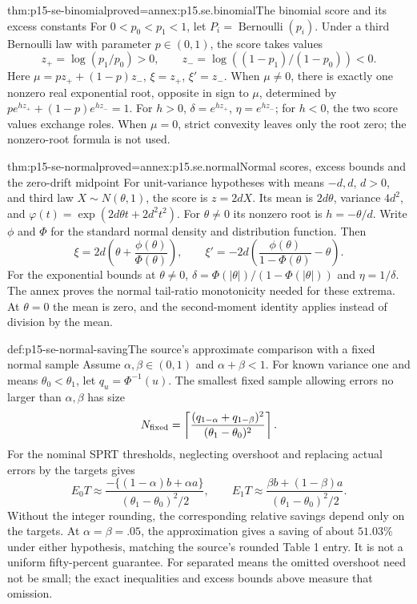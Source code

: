 \begin{hbtheorem}{thm:p15-se-binomial}{proved=annex:p15.se.binomial}{The binomial score and its excess constants}
For \(0<p_0<p_1<1\), let \(P_i=\operatorname{Bernoulli}(p_i)\).
Under a third Bernoulli law with parameter \(p\in(0,1)\), the
score takes values
\[
 z_+=\log(p_1/p_0)>0,\qquad
 z_-=\log((1-p_1)/(1-p_0))<0.
\]
Here \(\mu=pz_++(1-p)z_-\), \(\xi=z_+\), \(\xi'=z_-\).
When \(\mu\ne0\), there is exactly one nonzero real exponential
root, opposite in sign to \(\mu\), determined by
\(pe^{hz_+}+(1-p)e^{hz_-}=1\). For \(h>0\),
\(\delta=e^{hz_+}\), \(\eta=e^{hz_-}\); for \(h<0\),
the two score values exchange roles. When \(\mu=0\), strict
convexity leaves only the root zero; the nonzero-root formula is not used.
\cite[Section 3.5 and Section 4.2]{Wald1945SequentialTests}
\end{hbtheorem}

\begin{hbtheorem}{thm:p15-se-normal}{proved=annex:p15.se.normal}{Normal scores, excess bounds and the zero-drift midpoint}
For unit-variance hypotheses with means \(-d,d\), \(d>0\), and
third law \(X\sim N(\theta,1)\), the score is \(z=2dX\).
Its mean is \(2d\theta\), variance \(4d^2\), and
\(\varphi(t)=\exp(2d\theta t+2d^2t^2)\).
For \(\theta\ne0\) its nonzero root is \(h=-\theta/d\).
Write \(\phi\) and \(\Phi\) for the standard normal density and
distribution function. Then
\[
 \xi=2d\left(\theta+\frac{\phi(\theta)}{\Phi(\theta)}\right),\qquad
 \xi'=-2d\left(\frac{\phi(\theta)}{1-\Phi(\theta)}-\theta\right).
\]
For the exponential bounds at \(\theta\ne0\),
\(\delta=\Phi(|\theta|)/(1-\Phi(|\theta|))\) and
\(\eta=1/\delta\). The annex proves the normal tail-ratio monotonicity
needed for these extrema. At \(\theta=0\) the mean is zero, and
the second-moment identity applies instead of division by the mean.
\cite[Equations (3.53)--(3.77), (4.17)--(4.24)]{Wald1945SequentialTests}
\end{hbtheorem}

\begin{hbmethod}{def:p15-se-normal-saving}{The source's approximate comparison with a fixed normal sample}
Assume \(\alpha,\beta\in(0,1)\) and \(\alpha+\beta<1\).
For known variance one and means
\(\theta_0<\theta_1\), let
\(q_u=\Phi^{-1}(u)\). The smallest fixed sample allowing errors no
larger than \(\alpha,\beta\) has size
\[
 N_{\rm fixed}=\left\lceil
 \frac{(q_{1-\alpha}+q_{1-\beta})^2}{(\theta_1-\theta_0)^2}
 \right\rceil .
\]
For the nominal SPRT thresholds, neglecting overshoot and replacing
actual errors by the targets gives
\[
 E_0T\approx
 \frac{-\{(1-\alpha)b+\alpha a\}}{(\theta_1-\theta_0)^2/2},\qquad
 E_1T\approx
 \frac{\beta b+(1-\beta)a}{(\theta_1-\theta_0)^2/2}.
\]
Without the integer rounding, the corresponding relative savings depend
only on the targets. At \(\alpha=\beta=.05\), the approximation
gives a saving of about \(51.03\%\) under either hypothesis, matching
the source's rounded Table 1 entry. It is not a uniform fifty-percent
guarantee. For separated means the omitted overshoot need not be small;
the exact inequalities and excess bounds above measure that omission.
\cite[Section 4.3, Table 1]{Wald1945SequentialTests}
\end{hbmethod}

